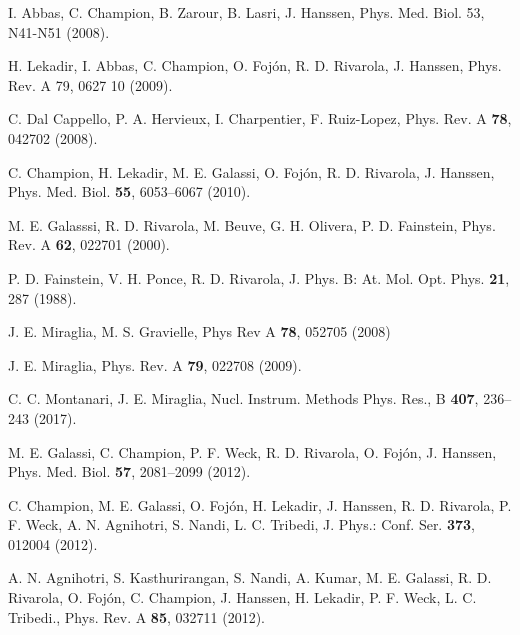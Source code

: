 \begin{thebibliography}{9}

I. Abbas, C. Champion, B. Zarour, B. Lasri, J. Hanssen,
Phys. Med. Biol. 53, N41-N51 (2008).

H. Lekadir, I. Abbas, C. Champion, O. Fojón, R. D. Rivarola, J. Hanssen,
Phys. Rev. A 79, 0627 10 (2009).

C. Dal Cappello, P. A. Hervieux, I. Charpentier, F. Ruiz-Lopez,
Phys. Rev. A \textbf{78}, 042702 (2008).

C. Champion, H. Lekadir, M. E. Galassi, O. Fojón, R. D. Rivarola, 
J. Hanssen,
Phys. Med. Biol. \textbf{55}, 6053--6067 (2010).

M. E. Galasssi, R. D. Rivarola, M. Beuve, G. H. Olivera, P. D. Fainstein, 
Phys. Rev. A \textbf{62}, 022701 (2000).

P. D. Fainstein, V. H. Ponce, R. D. Rivarola,
J. Phys. B: At. Mol. Opt. Phys. \textbf{21}, 287 (1988).

J. E. Miraglia, M. S. Gravielle,
Phys Rev A \textbf{78}, 052705 (2008)

J. E. Miraglia, 
Phys. Rev. A \textbf{79}, 022708 (2009).

C. C. Montanari, J. E. Miraglia,
Nucl. Instrum. Methods Phys. Res., B \textbf{407}, 236--243 (2017).

M. E. Galassi, C. Champion, P. F. Weck, R. D. Rivarola, O. Fojón, J. Hanssen,
Phys. Med. Biol. \textbf{57}, 2081--2099 (2012).

C. Champion, M. E. Galassi, O. Foj\'{o}n, H. Lekadir, J. Hanssen, 
R. D. Rivarola, P. F. Weck, A. N. Agnihotri, S. Nandi, L. C. Tribedi,
J. Phys.: Conf. Ser. \textbf{373}, 012004 (2012).

A. N. Agnihotri, S. Kasthurirangan, S. Nandi, A.
Kumar, M. E. Galassi, R. D. Rivarola, O. Foj\'{o}n, C. Champion, J. Hanssen,
H. Lekadir, P. F. Weck, L. C. Tribedi.,
Phys. Rev. A \textbf{85}, 032711 (2012).


\end{thebibliography}
